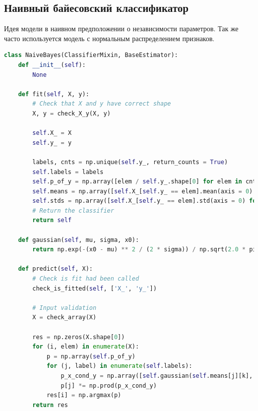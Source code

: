 \subsection{Наивный байесовский классификатор}
Идея модели в наивном предположении о независимости параметров. Так же часто используется модель с нормальным распределением признаков.
\begin{lstlisting}[language=Python]
class NaiveBayes(ClassifierMixin, BaseEstimator):
    def __init__(self):
        None

    def fit(self, X, y):
        # Check that X and y have correct shape
        X, y = check_X_y(X, y)

        self.X_ = X
        self.y_ = y

        labels, cnts = np.unique(self.y_, return_counts = True)
        self.labels = labels
        self.p_of_y = np.array([elem / self.y_.shape[0] for elem in cnts])
        self.means = np.array([self.X_[self.y_ == elem].mean(axis = 0) for elem in labels])
        self.stds = np.array([self.X_[self.y_ == elem].std(axis = 0) for elem in labels])
        # Return the classifier
        return self

    def gaussian(self, mu, sigma, x0):
        return np.exp(-(x0 - mu) ** 2 / (2 * sigma)) / np.sqrt(2.0 * pi * sigma)

    def predict(self, X):
        # Check is fit had been called
        check_is_fitted(self, ['X_', 'y_'])

        # Input validation
        X = check_array(X)

        res = np.zeros(X.shape[0])
        for (i, elem) in enumerate(X):
            p = np.array(self.p_of_y)
            for (j, label) in enumerate(self.labels):
                p_x_cond_y = np.array([self.gaussian(self.means[j][k], self.stds[j][k], elem[k]) for k in range(X.shape[1])])
                p[j] *= np.prod(p_x_cond_y)
            res[i] = np.argmax(p)
        return res
\end{lstlisting}
\pagebreak

